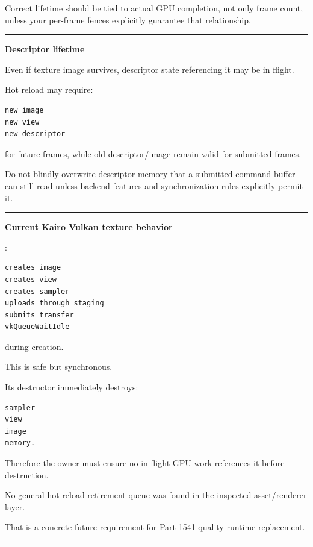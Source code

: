 Correct lifetime should be tied to actual GPU completion, not only frame count, unless your per-frame fences explicitly guarantee that relationship.

\begin{center}\rule{0.5\linewidth}{0.5pt}\end{center}

\textbf{Descriptor lifetime}

Even if texture image survives, descriptor state referencing it may be in flight.

Hot reload may require:

\begin{verbatim}
new image
new view
new descriptor
\end{verbatim}

for future frames, while old descriptor/image remain valid for submitted frames.

Do not blindly overwrite descriptor memory that a submitted command buffer can still read unless backend features and synchronization rules explicitly permit it.

\begin{center}\rule{0.5\linewidth}{0.5pt}\end{center}

\textbf{Current Kairo Vulkan texture behavior}

:

\begin{verbatim}
creates image
creates view
creates sampler
uploads through staging
submits transfer
vkQueueWaitIdle
\end{verbatim}

during creation.

This is safe but synchronous.

Its destructor immediately destroys:

\begin{verbatim}
sampler
view
image
memory.
\end{verbatim}

Therefore the owner must ensure no in-flight GPU work references it before destruction.

No general hot-reload retirement queue was found in the inspected asset/renderer layer.

That is a concrete future requirement for Part 1541-quality runtime replacement.

\begin{center}\rule{0.5\linewidth}{0.5pt}\end{center}

